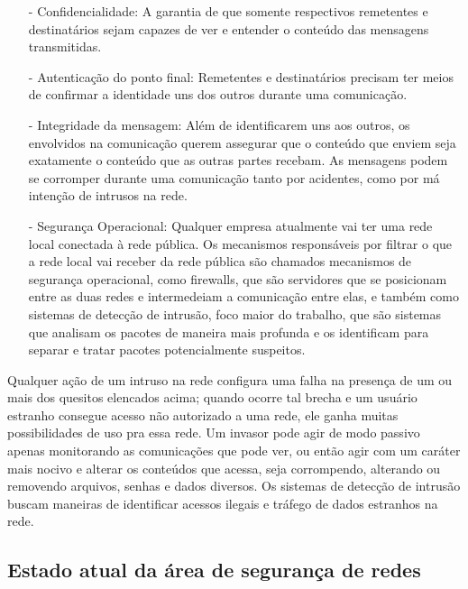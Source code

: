 \begin{itemize}
\item[-] Confidencialidade: A garantia de que somente respectivos remetentes e destinatários sejam capazes de ver e entender o conteúdo das mensagens transmitidas.
\item[-] Autenticação do ponto final: Remetentes e destinatários precisam ter meios de confirmar a identidade uns dos outros durante uma comunicação.
\item[-] Integridade da mensagem: Além de identificarem uns aos outros, os envolvidos na comunicação querem assegurar que o conteúdo que enviem seja exatamente o conteúdo que as outras partes recebam. As mensagens podem se corromper durante uma comunicação tanto por acidentes, como por má intenção de intrusos na rede.
\item[-] Segurança Operacional: Qualquer empresa atualmente vai ter uma rede local conectada à rede pública. Os mecanismos responsáveis por filtrar o que a rede local vai receber da rede pública são chamados mecanismos de segurança operacional, como firewalls, que são servidores que se posicionam entre as duas redes e intermedeiam a comunicação entre elas, e também como sistemas de detecção de intrusão, foco maior do trabalho, que são sistemas que analisam os pacotes de maneira mais profunda e os identificam para separar e tratar pacotes potencialmente suspeitos.
\end{itemize}

Qualquer ação de um intruso na rede configura uma falha na presença de um ou
mais dos quesitos elencados acima; quando ocorre tal brecha e um usuário
estranho consegue acesso não autorizado a uma rede, ele ganha muitas
possibilidades de uso pra essa rede. Um invasor pode agir de modo passivo
apenas monitorando as comunicações que pode ver, ou então agir com um caráter
mais nocivo e alterar os conteúdos que acessa, seja corrompendo, alterando ou
removendo arquivos, senhas e dados diversos. Os sistemas de detecção de
intrusão buscam maneiras de identificar acessos ilegais e tráfego de dados
estranhos na rede. \subsection{Estado atual da área de segurança de redes}
\label{sub:estado_da_arte}

